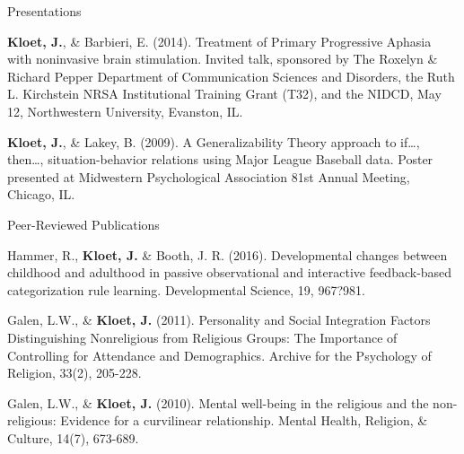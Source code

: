 \begin{cventries}

  \cventry
    {} %
    {Presentations} %
    {} %
    {} %
    {
      \vspace{-4mm}
      \begin{cvitems} %
        \item {{\textbf{Kloet, J.}}, \& Barbieri, E. (2014). Treatment of Primary Progressive Aphasia with noninvasive brain stimulation. Invited talk, sponsored by The Roxelyn \& Richard Pepper Department of Communication Sciences and Disorders, the Ruth L. Kirchstein NRSA Institutional Training Grant (T32), and the NIDCD, May 12, Northwestern University, Evanston, IL. }
        \item {{\textbf{Kloet, J.}}, \& Lakey, B. (2009). A Generalizability Theory approach to if\dots, then\dots, situation-behavior relations using Major League Baseball data. Poster presented at Midwestern Psychological Association 81st Annual Meeting, Chicago, IL.}
      \end{cvitems}
    }

\cventry
    {} %
    {Peer-Reviewed Publications} %
    {} %
    {} %
    {
      \vspace{-4mm}
      \begin{cvitems} %
       \item {Hammer, R., \textbf{Kloet, J.} \& Booth, J. R. (2016). Developmental changes between childhood and adulthood in passive observational and interactive feedback-based categorization rule learning. Developmental Science, 19, 967?981.}
        \item {Galen, L.W., \& \textbf{Kloet, J.} (2011). Personality and Social Integration Factors Distinguishing Nonreligious from Religious Groups: The Importance of Controlling for Attendance and Demographics. Archive for the Psychology of Religion, 33(2), 205-228.}
        \item {Galen, L.W., \& \textbf{Kloet, J.} (2010). Mental well-being in the religious and the non-religious: Evidence for a curvilinear relationship. Mental Health, Religion, \& Culture, 14(7), 673-689.}
      \end{cvitems}
    }

\end{cventries}
